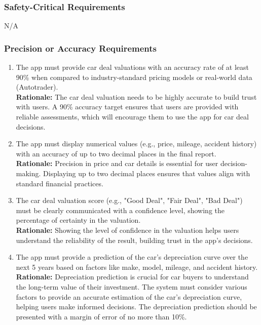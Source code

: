 \documentclass[]{article}
\begin{document}
\subsubsection{Safety-Critical Requirements}
\label{ssub:safety_critical_requirements}
N/A


\subsubsection{Precision or Accuracy Requirements}
\label{ssub:precision_or_accuracy_requirements}
\begin{enumerate}[{PR-PA}1.]
    \item The app must provide car deal valuations with an accuracy rate of at least 90\% when compared to industry-standard pricing models or real-world data (Autotrader). \\ 
    \textbf{Rationale:} The car deal valuation needs to be highly accurate to build trust with users. A 90\% accuracy target ensures that users are provided with reliable assessments, which will encourage them to use the app for car deal decisions.

    \item The app must display numerical values (e.g., price, mileage, accident history) with an accuracy of up to two decimal places in the final report.  \\
    \textbf{Rationale:} Precision in price and car details is essential for user decision-making. Displaying up to two decimal places ensures that values align with standard financial practices.

    \item The car deal valuation score (e.g., "Good Deal", "Fair Deal", "Bad Deal") must be clearly communicated with a confidence level, showing the percentage of certainty in the valuation.  \\
    \textbf{Rationale:} Showing the level of confidence in the valuation helps users understand the reliability of the result, building trust in the app's decisions.

    \item The app must provide a prediction of the car's depreciation curve over the next 5 years based on factors like make, model, mileage, and accident history.  \\
    \textbf{Rationale:} Depreciation prediction is crucial for car buyers to understand the long-term value of their investment. The system must consider various factors to provide an accurate estimation of the car's depreciation curve, helping users make informed decisions. The depreciation prediction should be presented with a margin of error of no more than 10\%.
\end{enumerate}
\end{document}
